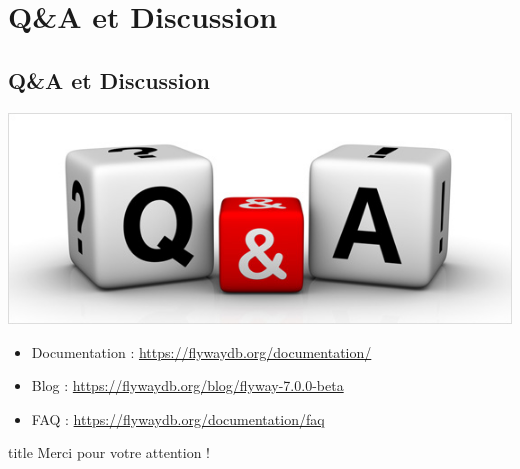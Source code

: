 \documentclass[slidestop,compress,11pt,xcolor=dvipsnames,french]{beamer}
\begin{document}
\section[Discussion]{Q\&A et Discussion}

\subsection*{Q\&A et Discussion}
\begin{frame}
\begin{center}
 \includegraphics[scale=0.3,keepaspectratio=true]{qa.jpg}
\end{center}

\vspace{1cm}
\begin{itemize}
 \item Documentation : \url{https://flywaydb.org/documentation/} 
 \item Blog : \url{https://flywaydb.org/blog/flyway-7.0.0-beta}
 \item FAQ : \url{https://flywaydb.org/documentation/faq}
\end{itemize}

\end{frame}

\begin{frame}
\vspace{2.5cm}
\begin{center} 
\begin{beamercolorbox}[rounded=true,sep=8pt,center]{title}
   	\Huge Merci pour votre attention ! 
		\end{beamercolorbox}%
\end{center} 
\end{frame} 
\end{document}
